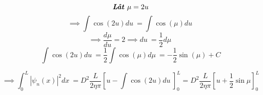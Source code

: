 \documentclass{article}
\newcommand{\shrodprob}{|\psi_n(x)|^2}
\begin{document}
$$
\emph{\textbf{Låt $\mu = 2u$}}
$$
$$
\implies \int \cos(2u) du\ = \int \cos(\mu) du\
$$
$$
\implies \frac{d\mu}{du} = 2 \implies du\ = \frac{1}{2} d\mu\
$$
$$
\int \cos(2u) du\ = \frac{1}{2} \int \cos(\mu) d\mu\ = -\frac{1}{2} \sin(\mu) + C
$$

$$
\implies \int_0^L \shrodprob dx\ 
= D^2 \frac{L}{2\eta\pi} \left[u - \int \cos(2u) du\ \right]_0^L
= D^2 \frac{L}{2\eta\pi} \left[ u + \frac{1}{2}\sin \mu \right]_0^L
$$
\end{document}
